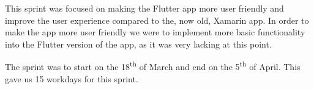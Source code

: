 This sprint was focused on making the Flutter app more user friendly and improve the user experience compared to the, now old, Xamarin app.
In order to make the app more user friendly we were to implement more basic functionality into the Flutter version of the app, as it was very lacking at this point.

The sprint was to start on the 18\textsuperscript{th} of March and end on the 5\textsuperscript{th} of April. This gave us 15 workdays for this sprint.
